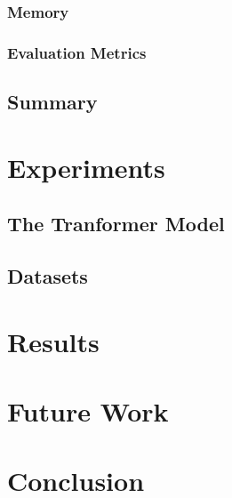 \documentclass[12pt]{article}
\begin{document}
\subsubsection{Memory}
\subsubsection{Evaluation Metrics}
\subsection{Summary} \label{ssec:33}
    

\newpage\section{Experiments} \label{sec:experiments}

\subsection{The Tranformer Model} \label{ssec:41}

\subsection{Datasets} \label{ssec:42}

\newpage\section{Results} \label{sec:results}
\newpage\section{Future Work} \label{sec:future}
\newpage\section{Conclusion} \label{sec:conclusion}




\newpage
\end{document}
